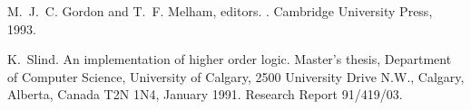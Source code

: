 \begin{thebibliography}{9}

M.~J.~C. Gordon and T.~F. Melham, editors.
.
\newblock Cambridge University Press, 1993.

K.~Slind.
\newblock An implementation of higher order logic.
\newblock Master's thesis, Department of Computer Science, University of
  Calgary, 2500 University Drive N.W., Calgary, Alberta, Canada T2N 1N4,
  January 1991.
\newblock Research Report 91/419/03.

\end{thebibliography}
